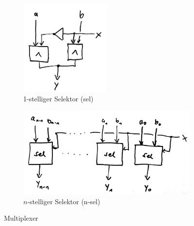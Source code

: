 \documentclass{article}
\begin{document}
    \begin{figure}[h]
        \begin{subfigure}[b]{0.5\textwidth}
            \centering
            \includegraphics[width=0.5\textwidth]{sel.jpeg}
            \caption{1-stelliger Selektor (sel)}
            \label{f:sel}
        \end{subfigure}
        \begin{subfigure}[b]{0.5\textwidth}
            \centering
            \includegraphics[width=\textwidth]{nsel.jpeg}
            \caption{$n$-stelliger Selektor (n-sel)}
            \label{f:nsel}
        \end{subfigure}
        \caption{Multiplexer}
        \label{f:multiplexer}
    \end{figure}
\end{document}
